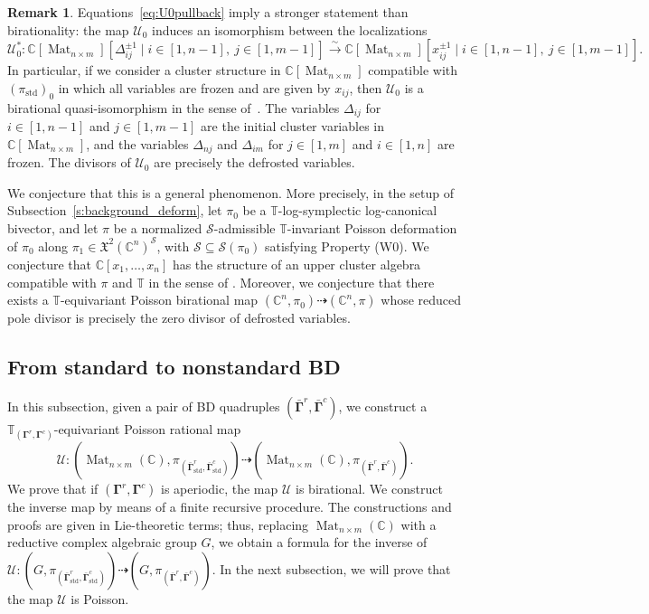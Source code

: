 \documentclass[11pt]{article}
\newcommand{\bbg}{\bar{\mathbf{\Gamma}}}
\newcommand{\bg}{\mathbf{\Gamma}}
\newcommand{\std}{\mathrm{std}}
\DeclareMathOperator{\Mat}{Mat}
\theoremstyle{definition}\newtheorem{definition}[theorem]{Definition}
\theoremstyle{definition}\newtheorem{remark}[theorem]{Remark}
\theoremstyle{remark}
\numberwithin{equation}{section}
\begin{document}
\begin{remark} 
    Equations~\eqref{eq:U0pullback} imply a stronger statement than birationality: the map $\mathcal{U}_0$ induces an isomorphism between the localizations
    \begin{equation*}
        \mathcal{U}_0^* : \mathbb{C}[\Mat_{n\times m}][\Delta_{ij}^{\pm 1} \mid i \in [1,n-1],\ j \in [1,m-1] ] \xrightarrow{\sim} \mathbb{C}[\Mat_{n\times m}][x_{ij}^{\pm 1} \mid i \in [1,n-1],\ j \in [1,m-1] ].
    \end{equation*}
    In particular, if we consider a cluster structure in $\mathbb{C}[\Mat_{n\times m}]$ compatible with $(\pi_{\std})_0$ in which all variables are frozen and are given by $x_{ij}$, then $\mathcal{U}_0$ is a birational quasi-isomorphism in the sense of~\cite{zametka}. The variables $\Delta_{ij}$ for $i \in [1,n-1]$ and $j \in [1,m-1]$ are the initial cluster variables in $\mathbb{C}[\Mat_{n\times m}]$, and the variables $\Delta_{nj}$ and $\Delta_{im}$ for $j \in [1,m]$ and $i \in [1,n]$ are frozen. The divisors of $\mathcal{U}_0$ are precisely the defrosted variables. 
    
    We conjecture that this is a general phenomenon. More precisely, in the setup of Subsection~\ref{s:background_deform}, let $\pi_0$ be a $\mathbb{T}$-log-symplectic log-canonical bivector, and let $\pi$ be a normalized $\mathcal{S}$-admissible $\mathbb{T}$-invariant Poisson deformation of $\pi_0$ along $\pi_1 \in \mathfrak{X}^2(\mathbb{C}^n)^{\mathcal{S}}$, with $\mathcal{S}\subseteq \mathcal{S}(\pi_0)$ satisfying Property (W0). We conjecture that $\mathbb{C}[x_1,\ldots,x_n]$ has the structure of an upper cluster algebra compatible with $\pi$ and $\mathbb{T}$ in the sense of \cite{gsv-book}. Moreover, we conjecture that there exists a $\mathbb{T}$-equivariant Poisson birational map $(\mathbb{C}^n,\pi_0)\dashrightarrow(\mathbb{C}^n,\pi)$ whose reduced pole divisor is precisely the zero divisor of defrosted variables.
\end{remark}

\subsection{From standard to nonstandard BD}\label{s:biratgen}
In this subsection, given a pair of BD quadruples $(\bbg^r,\bbg^c)$, we construct a $\mathbb{T}_{(\bg^r,\bg^c)}$-equivariant Poisson rational map
\begin{equation*}
    \mathcal{U} : (\Mat_{n \times m}(\mathbb{C}),\pi_{(\bbg_{\std}^r,\bbg_{\std}^c)}) \dashrightarrow (\Mat_{n \times m}(\mathbb{C}), \pi_{(\bbg^r,\bbg^c)}).
\end{equation*}
We prove that if $(\bg^r,\bg^c)$ is aperiodic, the map $\mathcal{U}$ is birational. We construct the inverse map by means of a finite recursive procedure. The constructions and proofs are given in Lie-theoretic terms; thus, replacing $\Mat_{n\times m}(\mathbb{C})$ with a reductive complex algebraic group $G$, we obtain a formula for the inverse of $\mathcal{U}:(G,\pi_{(\bbg^r_{\std},\bbg^c_{\std})}) \dashrightarrow (G,\pi_{(\bbg^r,\bbg^c)})$. In the next subsection, we will prove that the map $\mathcal{U}$ is Poisson.
\end{document}
